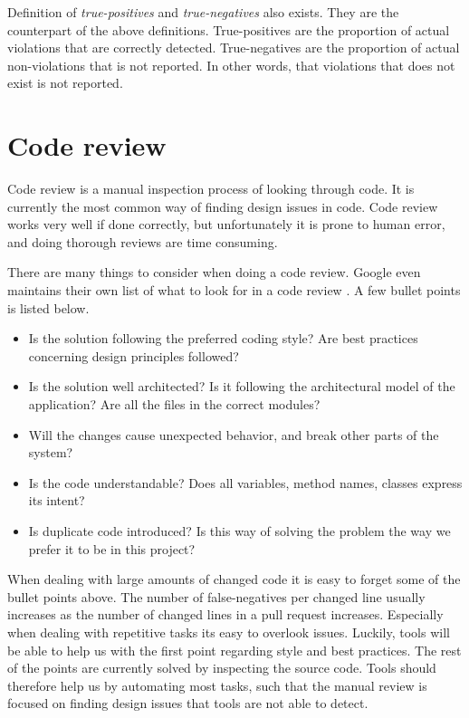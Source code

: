 \documentclass{report}
\begin{document}
Definition of \textit{true-positives} and \textit{true-negatives} also exists. They are the counterpart of the above definitions. True-positives are the proportion of actual violations that are correctly detected. True-negatives are the proportion of actual non-violations that is not reported. In other words, that violations that does not exist is not reported. 



\section{Code review}
\label{code-review}
Code review is a manual inspection process of looking through code. It is currently the most common way of finding design issues in code. Code review works very well if done correctly, but unfortunately it is prone to human error, and doing thorough reviews are time consuming.

There are many things to consider when doing a code review. Google even maintains their own list of what to look for in a code review \cite{google-codereview}. A few bullet points is listed below.

\begin{itemize}
    \item Is the solution following the preferred coding style? Are best practices concerning design principles followed?
    
    \item Is the solution well architected? Is it following the architectural model of the application? Are all the files in the correct modules?
    
    \item Will the changes cause unexpected behavior, and break other parts of the system? 
    
    \item Is the code understandable? Does all variables, method names, classes express its intent?
    
     \item Is duplicate code introduced? Is this way of solving the problem the way we prefer it to be in this project?
\end{itemize}

When dealing with large amounts of changed code it is easy to forget some of the bullet points above. The number of false-negatives per changed line usually increases as the number of changed lines in a pull request increases.  Especially when dealing with repetitive tasks its easy to overlook issues. Luckily, tools will be able to help us with the first point regarding style and best practices. The rest of the points are currently solved by inspecting the source code. Tools should therefore help us by automating most tasks, such that the manual review is focused on finding design issues that tools are not able to detect. 
\end{document}
